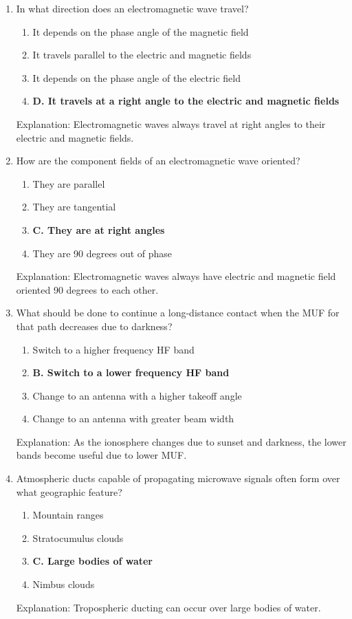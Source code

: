 \begin{enumerate}
  \item In what direction does an electromagnetic wave travel?
    \begin{enumerate}
         \item  It depends on the phase angle of the magnetic field
         \item  It travels parallel to the electric and magnetic fields
      \item  It depends on the phase angle of the electric field
         \item \textbf{D. It travels at a right angle to the electric and magnetic fields}
     \end{enumerate}
       \textcolor{myred}{Explanation:}
    Electromagnetic waves always travel at right angles to their electric and magnetic fields.
   
    \item How are the component fields of an electromagnetic wave oriented?
       \begin{enumerate}
        \item  They are parallel
      \item  They are tangential
        \item \textbf{C. They are at right angles}
         \item  They are 90 degrees out of phase
        \end{enumerate}
         \textcolor{myred}{Explanation:}
        Electromagnetic waves always have electric and magnetic field oriented 90 degrees to each other.
    
    \item What should be done to continue a long-distance contact when the MUF for that path decreases due to darkness?
       \begin{enumerate}
           \item  Switch to a higher frequency HF band
       \item \textbf{B. Switch to a lower frequency HF band}
        \item  Change to an antenna with a higher takeoff angle
         \item  Change to an antenna with greater beam width
        \end{enumerate}
    \textcolor{myred}{Explanation:}
     As the ionosphere changes due to sunset and darkness, the lower bands become useful due to lower MUF.

   \item Atmospheric ducts capable of propagating microwave signals often form over what geographic feature?
     \begin{enumerate}
        \item  Mountain ranges
      \item  Stratocumulus clouds
      \item \textbf{C. Large bodies of water}
       \item  Nimbus clouds
     \end{enumerate}
      \textcolor{myred}{Explanation:}
    Tropospheric ducting can occur over large bodies of water.
       

\end{enumerate}
